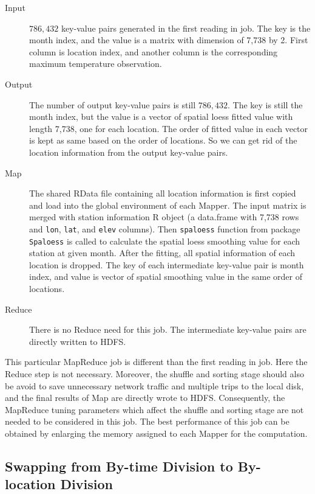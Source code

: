 \begin{description}
  \item[Input] $786,432$ key-value pairs generated in the first reading in job.
  The key is the month index, and the value is a matrix with dimension of 7,738
  by 2. First column is location index, and another column is the corresponding 
  maximum temperature observation.
  \item[Output] The number of output key-value pairs is still $786,432$. The key
  is still the month index, but the value is a vector of spatial loess fitted
  value with length 7,738, one for each location. The order of fitted value in 
  each vector is kept as same based on the order of locations. So we can get rid
  of the location information from the output key-value pairs.
  \item[Map] The shared RData file containing all location information is first 
  copied and load into the global environment of each Mapper. The input matrix
  is merged with station information R object (a data.frame with 7,738 rows and
  \texttt{lon}, \texttt{lat}, and \texttt{elev} columns). Then \texttt{spaloess}
  function from package \texttt{Spaloess} is called to calculate the spatial
  loess smoothing value for each station at given month. After the fitting,
  all spatial information of each location is dropped. The key of each 
  intermediate key-value pair is month index, and value is vector of spatial 
  smoothing value in the same order of locations. 
  \item[Reduce] There is no Reduce need for this job. The intermediate key-value
  pairs are directly written to HDFS.
\end{description}

This particular MapReduce job is different than the first reading in job. Here
the Reduce step is not necessary. Moreover, the shuffle and sorting stage should
also be avoid to save unnecessary network traffic and multiple trips to the local 
disk, and the final results of Map are directly wrote to HDFS. Consequently, the
MapReduce tuning parameters which affect the shuffle and sorting stage are not 
needed to be considered in this job. The best performance of this job can be 
obtained by enlarging the memory assigned to each Mapper for the computation.

\subsection{Swapping from By-time Division to By-location Division}

